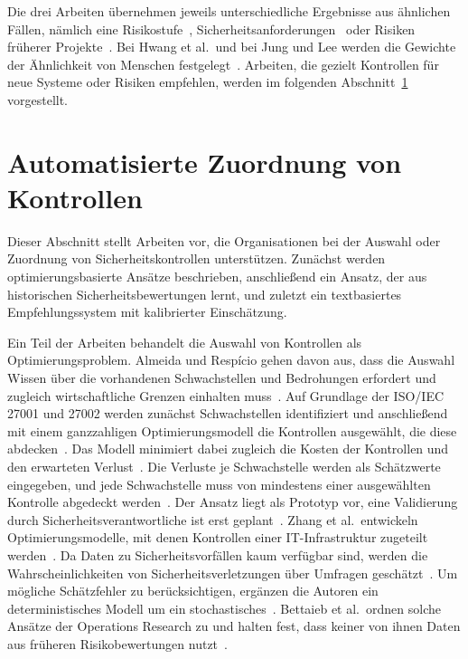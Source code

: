 Die drei Arbeiten übernehmen jeweils unterschiedliche Ergebnisse aus ähnlichen Fällen, nämlich eine Risikostufe~\cite[S.~29]{Hwang2004}, Sicherheitsanforderungen~\cite[S.~23]{Jung2023} oder Risiken früherer Projekte~\cite[S.~1]{Erfani2022}.
Bei Hwang et al.\ und bei Jung und Lee werden die Gewichte der Ähnlichkeit von Menschen festgelegt~\cites[S.~28]{Hwang2004}[S.~23]{Jung2023}.
Arbeiten, die gezielt Kontrollen für neue Systeme oder Risiken empfehlen, werden im folgenden Abschnitt~\ref{sec:rw-controls} vorgestellt.

\section{Automatisierte Zuordnung von Kontrollen}\label{sec:rw-controls}
Dieser Abschnitt stellt Arbeiten vor, die Organisationen bei der Auswahl oder Zuordnung von Sicherheitskontrollen unterstützen.
Zunächst werden optimierungsbasierte Ansätze beschrieben, anschließend ein Ansatz, der aus historischen Sicherheitsbewertungen lernt, und zuletzt ein textbasiertes Empfehlungssystem mit kalibrierter Einschätzung.

Ein Teil der Arbeiten behandelt die Auswahl von Kontrollen als Optimierungsproblem.
Almeida und Respício gehen davon aus, dass die Auswahl Wissen über die vorhandenen Schwachstellen und Bedrohungen erfordert und zugleich wirtschaftliche Grenzen einhalten muss~\cite[S.~173]{Almeida2018}.
Auf Grundlage der ISO/IEC 27001 und 27002 werden zunächst Schwachstellen identifiziert und anschließend mit einem ganzzahligen Optimierungsmodell die Kontrollen ausgewählt, die diese abdecken~\cite[S.~173]{Almeida2018}.
Das Modell minimiert dabei zugleich die Kosten der Kontrollen und den erwarteten Verlust~\cite[S.~174]{Almeida2018}.
Die Verluste je Schwachstelle werden als Schätzwerte eingegeben, und jede Schwachstelle muss von mindestens einer ausgewählten Kontrolle abgedeckt werden~\cite[S.~178]{Almeida2018}.
Der Ansatz liegt als Prototyp vor, eine Validierung durch Sicherheitsverantwortliche ist erst geplant~\cite[S.~179]{Almeida2018}.
Zhang et al.\ entwickeln Optimierungsmodelle, mit denen Kontrollen einer IT-Infrastruktur zugeteilt werden~\cite[S.~92]{Zhang2018}.
Da Daten zu Sicherheitsvorfällen kaum verfügbar sind, werden die Wahrscheinlichkeiten von Sicherheitsverletzungen über Umfragen geschätzt~\cite[S.~92]{Zhang2018}.
Um mögliche Schätzfehler zu berücksichtigen, ergänzen die Autoren ein deterministisches Modell um ein stochastisches~\cites[S.~92]{Zhang2018}[S.~102]{Zhang2018}.
Bettaieb et al.\ ordnen solche Ansätze der Operations Research zu und halten fest, dass keiner von ihnen Daten aus früheren Risikobewertungen nutzt~\cite[S.~2555--2556]{Bettaieb2020}.


